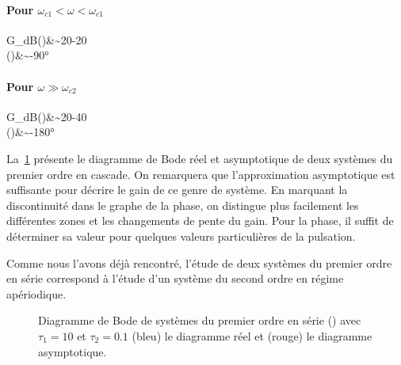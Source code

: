\paragraph{Pour $\omega_{c1}<\omega<\omega_{c1}$}
\begin{bequation}
    G_{dB}(\omega)&\sim20-20\\
    \phi(\omega)&\sim-90\si{\degree}
\end{bequation}
\paragraph{Pour $\omega\gg\omega_{c2}$}
\begin{bequation}
    G_{dB}(\omega)&\sim20-40\\
    \phi(\omega)&\sim-180\si{\degree}
\end{bequation}
La~\cref{fig-bode_1er_serie} présente le diagramme de Bode réel et 
asymptotique de deux systèmes du premier ordre en cascade. On remarquera 
que l'approximation asymptotique est suffisante pour décrire le gain de ce 
genre de système. En marquant la discontinuité dans le graphe de la phase, 
on distingue plus facilement les différentes zones et les changements de 
pente du gain. Pour la phase, il suffit de déterminer sa valeur pour 
quelques valeurs particulières de la pulsation. 

Comme nous l'avons déjà rencontré, l'étude de deux systèmes du premier 
ordre en série correspond à l'étude d'un système du second ordre en 
régime apériodique.
\begin{figure}[!t]
    \centering
    

    
    \caption{Diagramme de Bode de systèmes du premier ordre en série 
    () avec $\tau_1=10$ et $\tau_2=0.1$ (bleu) le 
    diagramme réel et (rouge) le diagramme asymptotique.
    \label{fig-bode_1er_serie}}
\end{figure}
